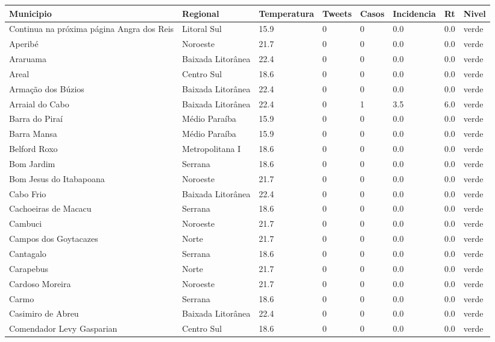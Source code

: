 \begin{longtable}{l|lllllll}
  \hline
Municipio & Regional & Temperatura & Tweets & Casos & Incidencia & Rt & Nivel \\ 
  \hline
\endhead
\hline
{\footnotesize Continua na próxima página}
\endfoot
\endlastfoot
Angra dos Reis & Litoral Sul & 15.9 & 0 & 0 & 0.0 & 0.0 & verde \\ 
  Aperibé & Noroeste & 21.7 & 0 & 0 & 0.0 & 0.0 & verde \\ 
  Araruama & Baixada Litorânea & 22.4 & 0 & 0 & 0.0 & 0.0 & verde \\ 
  Areal & Centro Sul & 18.6 & 0 & 0 & 0.0 & 0.0 & verde \\ 
  Armação dos Búzios & Baixada Litorânea & 22.4 & 0 & 0 & 0.0 & 0.0 & verde \\ 
  Arraial do Cabo & Baixada Litorânea & 22.4 & 0 & 1 & 3.5 & 6.0 & verde \\ 
  Barra do Piraí & Médio Paraíba & 15.9 & 0 & 0 & 0.0 & 0.0 & verde \\ 
  Barra Mansa & Médio Paraíba & 15.9 & 0 & 0 & 0.0 & 0.0 & verde \\ 
  Belford Roxo & Metropolitana I & 18.6 & 0 & 0 & 0.0 & 0.0 & verde \\ 
  Bom Jardim & Serrana & 18.6 & 0 & 0 & 0.0 & 0.0 & verde \\ 
  Bom Jesus do Itabapoana & Noroeste & 21.7 & 0 & 0 & 0.0 & 0.0 & verde \\ 
  Cabo Frio & Baixada Litorânea & 22.4 & 0 & 0 & 0.0 & 0.0 & verde \\ 
  Cachoeiras de Macacu & Serrana & 18.6 & 0 & 0 & 0.0 & 0.0 & verde \\ 
  Cambuci & Noroeste & 21.7 & 0 & 0 & 0.0 & 0.0 & verde \\ 
  Campos dos Goytacazes & Norte & 21.7 & 0 & 0 & 0.0 & 0.0 & verde \\ 
  Cantagalo & Serrana & 18.6 & 0 & 0 & 0.0 & 0.0 & verde \\ 
  Carapebus & Norte & 21.7 & 0 & 0 & 0.0 & 0.0 & verde \\ 
  Cardoso Moreira & Noroeste & 21.7 & 0 & 0 & 0.0 & 0.0 & verde \\ 
  Carmo & Serrana & 18.6 & 0 & 0 & 0.0 & 0.0 & verde \\ 
  Casimiro de Abreu & Baixada Litorânea & 22.4 & 0 & 0 & 0.0 & 0.0 & verde \\ 
  Comendador Levy Gasparian & Centro Sul & 18.6 & 0 & 0 & 0.0 & 0.0 & verde \\ 

\end{longtable}
